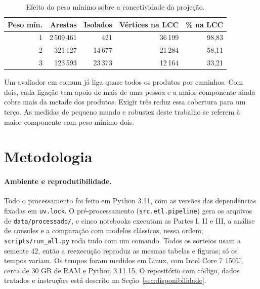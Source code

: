 \documentclass[sigconf,nonacm]{webmedia}
\begin{document}
\begin{table}[tbp]
\centering
\caption{Efeito do peso mínimo sobre a conectividade da projeção.}
\label{tab:limiar}
\small
\setlength{\tabcolsep}{4pt}
\begin{tabular}{rrrrr}
\toprule
Peso mín. & Arestas & Isolados & Vértices na LCC & \% na LCC \\
\midrule
1 & 2\,509\,461 & 421     & 36\,199 & 98,83 \\
2 &   321\,127 & 14\,677 & 21\,284 & 58,11 \\
3 &   123\,593 & 23\,373 & 12\,164 & 33,21 \\
\bottomrule
\end{tabular}
\end{table}

Um avaliador em comum já liga quase todos os produtos por caminhos.
Com dois, cada ligação tem apoio de mais de uma pessoa e a maior
componente ainda cobre mais da metade dos produtos. Exigir três reduz
essa cobertura para um terço. As medidas de pequeno mundo e robustez
deste trabalho se referem à maior componente com peso mínimo dois.

\section{Metodologia}
\label{sec:metodologia}

\paragraph{Ambiente e reprodutibilidade.}
Todo o processamento foi feito em Python 3.11, com as versões das
dependências fixadas em \texttt{uv.lock}. O pré-processamento
(\texttt{src.etl.pipeline}) gera os arquivos de
\texttt{data/processado/}, e cinco notebooks executam as Partes I, II
e III, a análise de consoles e a comparação com modelos clássicos,
nessa ordem; \texttt{scripts/run\_all.py} roda tudo com um comando. Todos os sorteios usam a
semente 42, então a reexecução reproduz as mesmas tabelas e figuras;
só os tempos variam. Os tempos foram medidos em Linux, com Intel Core 7
150U, cerca de 30 GB de RAM e Python 3.11.15. O repositório com
código, dados tratados e instruções está descrito na
Seção~\ref{sec:disponibilidade}.
\end{document}
